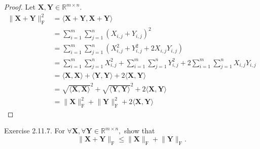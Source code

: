 \documentclass{article}
\theoremstyle{plain}
\begin{document}
\begin{proof}
	Let
	\begin{math}
		\bm{X} , \bm{Y} \in \mathbb{R}^{m \times n} .
	\end{math}
	\begin{equation}
		\begin{split}
			\lVert \bm{X} + \bm{Y} \rVert_\mathrm{F}^2 &= \langle \bm{X} + \bm{Y} , \bm{X} + \bm{Y} \rangle \\
			&= \sum_{i=1}^m \sum_{j=1}^n (X_{i,j} + Y_{i,j})^2 \\
			&= \sum_{i=1}^m \sum_{j=1}^n (X_{i,j}^2 + Y_{i,j}^2 + 2 X_{i,j} Y_{i,j}) \\
			&= \sum_{i=1}^m \sum_{j=1}^n X_{i,j}^2 
			+ \sum_{i=1}^m \sum_{j=1}^n Y_{i,j}^2 + 2 \sum_{i=1}^m \sum_{j=1}^n X_{i,j} Y_{i,j} \\
			&= \langle \bm{X} , \bm{X} \rangle + \langle \bm{Y} , \bm{Y} \rangle 
			+ 2 \langle \bm{X} , \bm{Y} \rangle \\
			&= \sqrt{\langle \bm{X} , \bm{X} \rangle}^2 + \sqrt{\langle \bm{Y} , \bm{Y} \rangle}^2
			+ 2 \langle \bm{X} , \bm{Y} \rangle \\
			&= \lVert \bm{X} \rVert_\mathrm{F}^2
			+ \lVert \bm{Y} \rVert_\mathrm{F}^2 + 2 \langle \bm{X} , \bm{Y} \rangle
		\end{split}
	\end{equation}
\end{proof}

\begin{itembox}[l]{Exercise 2.11.7.}
	For
	\begin{math}
		\forall \bm{X} , \forall \bm{Y} \in \mathbb{R}^{m \times n} ,
	\end{math}
	show that
	\begin{equation}
		\label{ex2117}
		\lVert \bm{X} + \bm{Y} \rVert_{\mathrm{F}} \leq \lVert \bm{X} \rVert_{\mathrm{F}} + \lVert \bm{Y} \rVert_{\mathrm{F}} .
	\end{equation}
\end{itembox}
\end{document}
